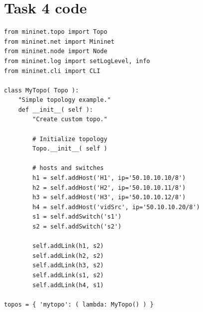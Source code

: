 \documentclass{article}
\begin{document}
\section{Task 4 code}
\begin{lstlisting}
from mininet.topo import Topo
from mininet.net import Mininet
from mininet.node import Node
from mininet.log import setLogLevel, info
from mininet.cli import CLI

class MyTopo( Topo ):  
    "Simple topology example."
    def __init__( self ):
        "Create custom topo."

        # Initialize topology
        Topo.__init__( self )

        # hosts and switches 
        h1 = self.addHost('H1', ip='50.10.10.10/8')
        h2 = self.addHost('H2', ip='50.10.10.11/8')
        h3 = self.addHost('H3', ip='50.10.10.12/8')
        h4 = self.addHost('vidSrc', ip='50.10.10.20/8')
        s1 = self.addSwitch('s1')
        s2 = self.addSwitch('s2')

        self.addLink(h1, s2)
        self.addLink(h2, s2)
        self.addLink(h3, s2)
        self.addLink(s1, s2)
        self.addLink(h4, s1)

topos = { 'mytopo': ( lambda: MyTopo() ) } 
\end{lstlisting}
\end{document}
